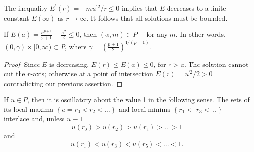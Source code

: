 The inequality $E^{\prime}(r) = -m u^{\prime 2} / r \leq 0$ implies that $E$ decreases to a
finite constant $E(\infty)$ as $r \rightarrow \infty$. It follows that all solutions must be
bounded.

\begin{lemma}\label{lemma:8}
  If $E(a)=\frac{\alpha^{p+1}}{p+1}-\frac{\alpha^2}{2} \leq 0$,
  then $(\alpha, m) \in P \quad$ for any $m$.
  In other words, $(0, \gamma) \times[0, \infty) \subset P$,
  where $\gamma=\left(\frac{p+1}{2}\right)^{1 /(p-1)}$.
\end{lemma}

\begin{proof}
  Since $E$ is decreasing, $E(r) \leq E(a) \leq 0$, for $r>a$.
  The solution cannot cut the
  $r$-axis; otherwise at a point of intersection
  $E(r)=u^{\prime 2} / 2>0$ contradicting our
  previous assertion.
\end{proof}

\begin{lemma}\label{lemma:9}
  If $u \in P$, then it is oscillatory about the value 1 in the following sense.
  The sets of its local maxima $\left\{a=r_0<r_2<\ldots\right\}$
  and local minima $\left\{r_1<\right.$ $\left.r_3<\ldots\right\}$ interlace and, 
  unless $u \equiv 1$
  \begin{equation}\label{eq:3.7}
    u\left(r_0\right)>u\left(r_2\right)>u\left(r_4\right)>\ldots>1    
  \end{equation}
  and
  \begin{equation}\label{eq:3.8}
    u\left(r_1\right)<u\left(r_3\right)<u\left(r_5\right)<\ldots<1.    
  \end{equation}
\end{lemma}


